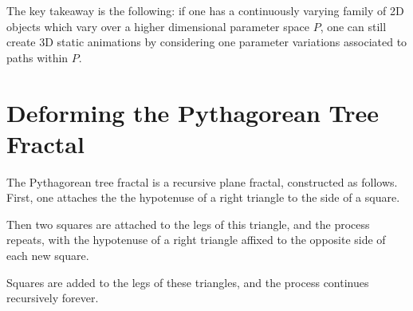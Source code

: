 \documentclass[12 pt]{article}
\begin{document}
The key takeaway is the following: if one has a continuously varying family of 2D objects which vary over a higher dimensional parameter space $P$, one can still create 3D static animations by considering one parameter variations associated to paths within $P$.
\section{Deforming the Pythagorean Tree Fractal}\label{treeSection}
The Pythagorean tree fractal is a recursive plane fractal, constructed as follows.  First, one attaches the the hypotenuse of a right triangle to the side of a square.
\begin{center}
\end{center}
Then two squares are attached to the legs of this triangle, and the process repeats, with the hypotenuse of a right triangle affixed to the opposite side of each new square.
\begin{center}
\end{center}
Squares are added to the legs of these triangles, and the process continues recursively forever.
\begin{center}
\end{center}
\end{document}
